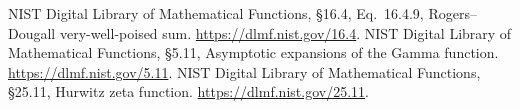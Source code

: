 NIST Digital Library of Mathematical Functions, \S16.4, Eq.~16.4.9,
Rogers--Dougall very-well-poised sum.
\url{https://dlmf.nist.gov/16.4}.
NIST Digital Library of Mathematical Functions, \S5.11,
Asymptotic expansions of the Gamma function.
\url{https://dlmf.nist.gov/5.11}.
NIST Digital Library of Mathematical Functions, \S25.11,
Hurwitz zeta function.
\url{https://dlmf.nist.gov/25.11}.
